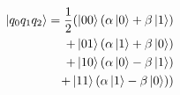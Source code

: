 \documentclass[preview]{standalone}
\begin{document}
\begin{align*}
\ket{q_0 q_1 q_2}= \frac{1}{2}( \ket{00}(\alpha \ket{0} + \beta \ket{1})\\ + \ket{01}( \alpha \ket{1} + \beta \ket{0})\\ +\ket{10} (\alpha \ket{0} - \beta \ket{1})\\ +\ket{11}(\alpha \ket{1} - \beta \ket{0}))
\end{align*}
\end{document}

